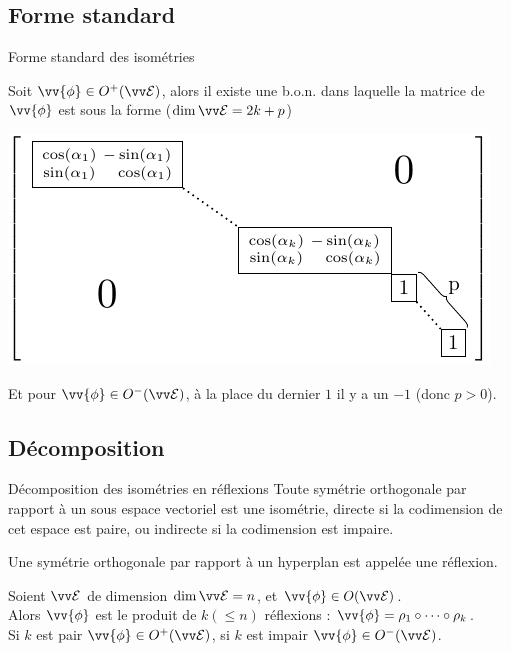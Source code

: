 \documentclass[bigger]{m53beamer}
\begin{document}
\subsection{Forme standard}
\begin{frame}{Forme standard des isométries}
  \begin{proposition}
    Soit $\vv{\phi} \in O^{+}(\ev{E})$, alors il existe une b.o.n. dans laquelle la matrice de $\vv{\phi}$ est sous la forme ($\dim\ev{E} = 2k+p$)
    \begin{center}
      \includegraphics{pictures/isometrymatrix.pdf}
    \end{center}\pause
    Et pour $\vv{\phi} \in O^{-}(\ev{E})$, à la place du dernier $1$ il y a un $-1$ (donc $p>0$).
  \end{proposition}
\end{frame}

\subsection{Décomposition}
\begin{frame}{Décomposition des isométries en réflexions}
  Toute symétrie orthogonale par rapport à un sous espace vectoriel est une isométrie\pause, directe si la codimension de cet espace est paire\pause, ou indirecte si la codimension est impaire.\pause
  \begin{definition}
    Une symétrie orthogonale par rapport à un hyperplan est appelée une \alert{réflexion}.\pause\\
  \end{definition}\pause
  \begin{proposition}
    Soient $\ev{E}$ de dimension $\dim\ev{E}=n$, et $\vv{\phi} \in O(\ev{E})$.\pause\\
    Alors $\vv{\phi}$ est le produit de $k (\leq n)$ réflexions : $\vv{\phi} = \rho_{1}\circ\cdots\circ\rho_{k}$.\pause\\
    Si $k$ est pair $\vv{\phi} \in O^{+}(\ev{E})$, si $k$ est impair $\vv{\phi} \in O^{-}(\ev{E})$.
  \end{proposition}
\end{frame}
\end{document}
